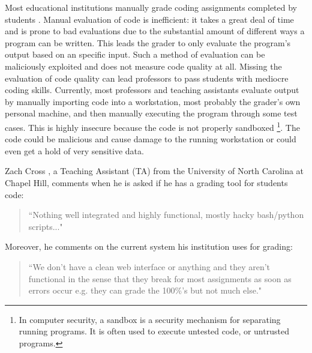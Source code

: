 

Most educational institutions manually grade coding assignments completed by
students \cite{Cheang2003}. Manual evaluation of code is inefficient: it takes a great deal of
time and is prone to bad evaluations due to the substantial amount of
different ways a program can be written. This leads the grader to only
evaluate the program's output based on an specific input. Such a method of
evaluation can be maliciously exploited and does not measure code quality at
all. Missing the evaluation of code quality can lead professors to pass
students with mediocre coding skills. Currently, most professors and teaching
assistants evaluate output by manually importing code into a workstation, most
probably the grader's own personal machine, and then manually executing the
program through some test cases. This is highly insecure because the code is
not properly sandboxed \footnote{In computer security, a sandbox is a security
mechanism for separating running programs. It is often used to execute
untested code, or untrusted programs.}. The code could be malicious and cause
damage to the running workstation or could even get a hold of very sensitive
data.


Zach Cross \cite{Zach}, a Teaching Assistant (TA) from the University of North
Carolina at Chapel Hill, comments when he is asked if he has a grading tool
for students code: \begin{quote} ``Nothing well integrated and highly
functional, mostly hacky bash/python scripts..." \end{quote} Moreover, he
comments on the current system his institution uses for grading: \begin{quote}
``We don't have a clean web interface or anything and they aren't functional
in the sense that they break for most assignments as soon as errors occur e.g.
they can grade the 100\%'s but not much else." \end{quote}

